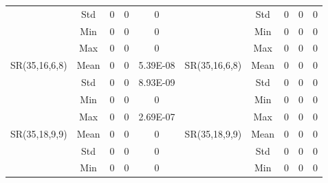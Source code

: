 \documentclass[letterpaper]{article} \usepackage{aaai24}  \usepackage{times}  \usepackage{helvet}  \usepackage{courier}  \usepackage[hyphens]{url}  \usepackage{graphicx} \urlstyle{rm} \def\UrlFont{\rm}  \usepackage{natbib}  \usepackage{caption} \frenchspacing  \setlength{\pdfpagewidth}{8.5in} \setlength{\pdfpageheight}{11in} \usepackage{algorithm}
\begin{document}
\begin{table*}[t]
{\begin{tabular}{@{}ccccc|ccccc@{}}
\multicolumn{1}{c|}{}                               & \multicolumn{1}{c|}{Std}  & 0         & 0         & 0        & \multicolumn{1}{c|}{}                               & \multicolumn{1}{c|}{Std}  & 0         & 0         & 0        \\
\multicolumn{1}{c|}{}                               & \multicolumn{1}{c|}{Min}  & 0         & 0         & 0        & \multicolumn{1}{c|}{}                               & \multicolumn{1}{c|}{Min}  & 0         & 0         & 0        \\
\multicolumn{1}{c|}{}                               & \multicolumn{1}{c|}{Max}  & 0         & 0         & 0        & \multicolumn{1}{c|}{}                               & \multicolumn{1}{c|}{Max}  & 0         & 0         & 0        \\ \midrule
\multicolumn{1}{c|}{\multirow{4}{*}{SR(35,16,6,8)}} & \multicolumn{1}{c|}{Mean} & 0         & 0         & 5.39E-08 & \multicolumn{1}{c|}{\multirow{4}{*}{SR(35,16,6,8)}} & \multicolumn{1}{c|}{Mean} & 0         & 0         & 0        \\
\multicolumn{1}{c|}{}                               & \multicolumn{1}{c|}{Std}  & 0         & 0         & 8.93E-09 & \multicolumn{1}{c|}{}                               & \multicolumn{1}{c|}{Std}  & 0         & 0         & 0        \\
\multicolumn{1}{c|}{}                               & \multicolumn{1}{c|}{Min}  & 0         & 0         & 0        & \multicolumn{1}{c|}{}                               & \multicolumn{1}{c|}{Min}  & 0         & 0         & 0        \\
\multicolumn{1}{c|}{}                               & \multicolumn{1}{c|}{Max}  & 0         & 0         & 2.69E-07 & \multicolumn{1}{c|}{}                               & \multicolumn{1}{c|}{Max}  & 0         & 0         & 0        \\ \midrule
\multicolumn{1}{c|}{\multirow{4}{*}{SR(35,18,9,9)}} & \multicolumn{1}{c|}{Mean} & 0         & 0         & 0        & \multicolumn{1}{c|}{\multirow{4}{*}{SR(35,18,9,9)}} & \multicolumn{1}{c|}{Mean} & 0         & 0         & 0        \\
\multicolumn{1}{c|}{}                               & \multicolumn{1}{c|}{Std}  & 0         & 0         & 0        & \multicolumn{1}{c|}{}                               & \multicolumn{1}{c|}{Std}  & 0         & 0         & 0        \\
\multicolumn{1}{c|}{}                               & \multicolumn{1}{c|}{Min}  & 0         & 0         & 0        & \multicolumn{1}{c|}{}                               & \multicolumn{1}{c|}{Min}  & 0         & 0         & 0        \\

\end{tabular}}
\end{table*}
\end{document}
